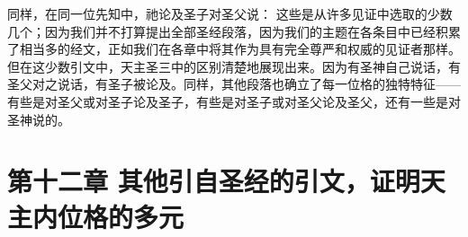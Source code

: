 同样，在同一位先知中，祂论及圣子对圣父说：  这些是从许多见证中选取的少数几个；因为我们并不打算提出全部圣经段落，因为我们的主题在各条目中已经积累了相当多的经文，正如我们在各章中将其作为具有完全尊严和权威的见证者那样。但在这少数引文中，天主圣三中的区别清楚地展现出来。因为有圣神自己说话，有圣父对之说话，有圣子被论及。同样，其他段落也确立了每一位格的独特特征——有些是对圣父或对圣子论及圣子，有些是对圣子或对圣父论及圣父，还有一些是对圣神说的。\par


\section{第十二章 其他引自圣经的引文，证明天主内位格的多元}

